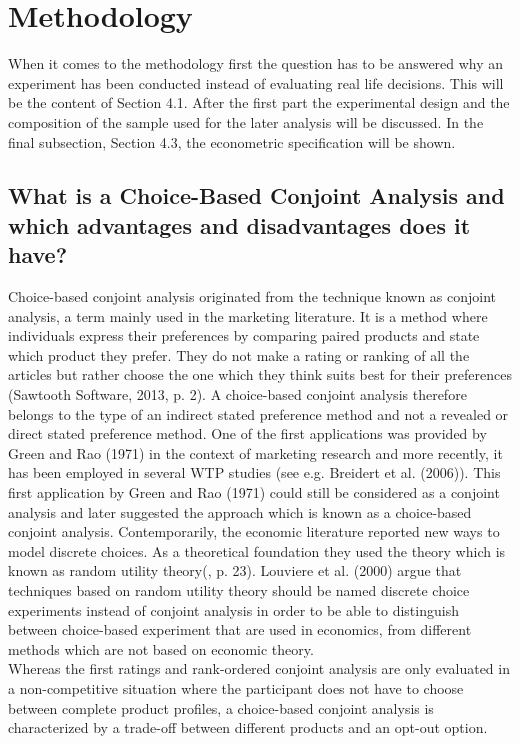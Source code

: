 \documentclass[12pt, abstracton]{article}
\begin{document}
\section{Methodology}
\label{Methodology}
When it comes to the methodology first the question has to be answered why an experiment has been conducted instead of evaluating real life decisions. This will be the content of Section 4.1. After the first part the experimental design and the composition of the sample used for the later analysis will be discussed. In the final subsection, Section 4.3, the econometric specification will be shown.
\subsection{What is a Choice-Based Conjoint Analysis and which advantages and disadvantages does it have?}
\label{cbc_analysis}
Choice-based conjoint analysis originated from the technique known as conjoint analysis, a term mainly used in the marketing literature. It is a method where individuals express their preferences by comparing paired products and state which product they prefer. They do not make a rating or ranking of all the articles but rather choose the one which they think suits best for their preferences (Sawtooth Software, 2013, p. 2). A choice-based conjoint analysis therefore belongs to the type of an indirect stated preference method and not a revealed or direct stated preference method. One of the first applications was provided by Green and Rao (1971) in the context of marketing research and more recently, it has been employed in several WTP studies (see e.g. Breidert et al. (2006)). This first application by Green and Rao (1971) could still be considered as a conjoint analysis and later \cite{Louviere1983} suggested the approach which is known as a choice-based conjoint analysis. Contemporarily, the economic literature reported new ways to model discrete choices. As a theoretical foundation they used the theory which is known as random utility theory(\cite{Kjaer2005}, p. 23). Louviere et al. (2000) argue that techniques based on random utility theory should be named discrete choice experiments instead of conjoint analysis in order to be able to distinguish between choice-based experiment that are used in economics, from different methods which are not based on economic theory.\\
 Whereas the first ratings and rank-ordered conjoint analysis are only evaluated in a non-competitive situation where the participant does not have to choose between complete product profiles, a choice-based conjoint analysis is characterized by a trade-off between different products and an opt-out option.\\
\end{document}
